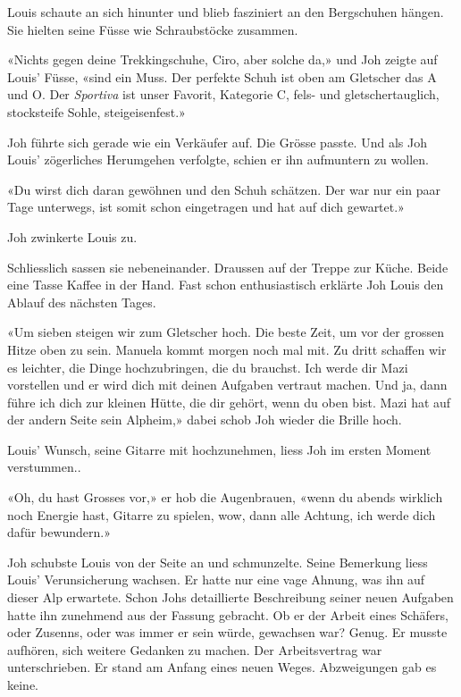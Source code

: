 Louis schaute an sich hinunter und blieb fasziniert an den Bergschuhen
hängen. Sie hielten seine Füsse wie Schraubstöcke zusammen.

«Nichts gegen deine Trekkingschuhe, Ciro, aber solche da,» und Joh
zeigte auf Louis’ Füsse, «sind ein Muss. Der perfekte Schuh ist oben am
Gletscher das A und O. Der \emph{Sportiva} ist unser Favorit, Kategorie
C, fels- und gletschertauglich, stocksteife Sohle, steigeisenfest.»

Joh führte sich gerade wie ein Verkäufer auf. Die Grösse passte. Und als
Joh Louis’ zögerliches Herumgehen verfolgte, schien er ihn aufmuntern zu
wollen.

«Du wirst dich daran gewöhnen und den Schuh schätzen. Der war nur ein
paar Tage unterwegs, ist somit schon eingetragen und hat auf dich
gewartet.»

Joh zwinkerte Louis zu.

Schliesslich sassen sie nebeneinander. Draussen auf der Treppe zur
Küche. Beide eine Tasse Kaffee in der Hand. Fast schon enthusiastisch
erklärte Joh Louis den Ablauf des nächsten Tages.

«Um sieben steigen wir zum Gletscher hoch. Die beste Zeit, um vor der
grossen Hitze oben zu sein. Manuela kommt morgen noch mal mit. Zu dritt
schaffen wir es leichter, die Dinge hochzubringen, die du brauchst. Ich
werde dir Mazi vorstellen und er wird dich mit deinen Aufgaben vertraut
machen. Und ja, dann führe ich dich zur kleinen Hütte, die dir gehört,
wenn du oben bist. Mazi hat auf der andern Seite sein Alpheim,» dabei
schob Joh wieder die Brille hoch.

Louis’ Wunsch, seine Gitarre mit hochzunehmen, liess Joh im ersten
Moment verstummen..

«Oh, du hast Grosses vor,» er hob die Augenbrauen, «wenn du abends
wirklich noch Energie hast, Gitarre zu spielen, wow, dann alle Achtung,
ich werde dich dafür bewundern.»

Joh schubste Louis von der Seite an und schmunzelte.
Seine Bemerkung liess Louis’ Verunsicherung wachsen. Er hatte nur eine
vage Ahnung, was ihn auf dieser Alp erwartete. 
Schon Johs detaillierte Beschreibung seiner neuen Aufgaben hatte ihn
zunehmend aus der Fassung gebracht. Ob er der Arbeit eines Schäfers,
oder Zusenns, oder was immer er sein würde, gewachsen war?
Genug. Er musste aufhören, sich weitere Gedanken zu machen. Der
Arbeitsvertrag war unterschrieben. Er stand am Anfang eines neuen Weges. 
Abzweigungen gab es keine.
  
\sectionbreak

